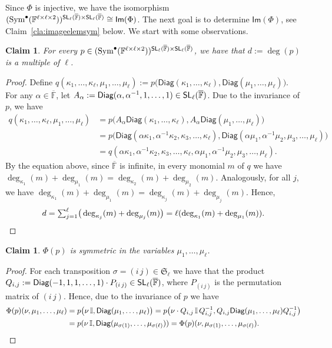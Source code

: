 \documentclass[a4paper]{extarticle}
\newcommand{\aS}{\mathfrak{S}}
\newcommand{\IF}{\mathbb{F}}
\newcommand{\oIF}{{\overline{\mathbb{F}}}}
\newcommand{\SL}{\textsf{\textup{SL}}}
\newcommand{\Sym}{\textup{Sym}}
\newcommand{\Diag}{\textsf{Diag}}
\renewcommand{\Im}{\mathsf{Im}}
\numberwithin{theorem}{section}
\newtheorem{claim}[theorem]{Claim}
\theoremstyle{definition}
\begin{document}
Since $\Phi$ is injective, we have the isomorphism $(\Sym^{\bullet}(\IF^{\ell\times\ell\times 2}))^{\SL_\ell(\oIF)\times \SL_\ell(\oIF)}\cong \Im(\Phi)$. The next goal is to determine $\Im(\Phi)$, see Claim~\ref{cla:imageelemsym} below. We start with some observations.
\begin{claim}\label{cla:multipleofell}
For every $p \in (\Sym^{\bullet}(\IF^{\ell\times\ell\times 2}))^{\SL_\ell(\oIF)\times \SL_\ell(\oIF)}$, we have that $d:=\deg(p)$ is a multiple of $\ell$.
\end{claim}
\begin{proof}
Define $q(\kappa_1,\dots,\kappa_\ell,\mu_1,\dots,\mu_\ell) := p\big(\Diag(\kappa_1,\dots,\kappa_\ell),\Diag(\mu_1,\dots,\mu_\ell)\big)$.
For any $\alpha\in\oIF$, let $A_\alpha := \Diag(\alpha,\alpha^{-1},1,\dots,1) \in \SL_\ell(\oIF)$.
Due to the invariance of $p$, we have
\begin{align*}
q(\kappa_1,\dots,\kappa_\ell,\mu_1,\dots,\mu_\ell) &= 
p\big(A_\alpha\Diag(\kappa_1,\dots,\kappa_\ell),A_\alpha\Diag(\mu_1,\dots,\mu_\ell)\big)
\\
&=
p\big(\Diag(\alpha\kappa_1,\alpha^{-1}\kappa_2,\kappa_3,\dots,\kappa_\ell),\Diag(\alpha\mu_1,\alpha^{-1}\mu_2,\mu_3,\dots,\mu_\ell)\big)
\\
&=
q(\alpha\kappa_1,\alpha^{-1}\kappa_2,\kappa_3,\dots,\kappa_\ell,\alpha \mu_1,\alpha^{-1}\mu_2,\mu_3,\dots,\mu_\ell).
\end{align*}
By the equation above, since $\oIF$ is infinite, in every monomial $m$ of $q$ we have $\deg_{\kappa_1}(m)+\deg_{\mu_1}(m)=\deg_{\kappa_2}(m)+\deg_{\mu_2}(m)$.
Analogously, for all $j$, we have $\deg_{\kappa_1}(m)+\deg_{\mu_1}(m)=\deg_{\kappa_j}(m)+\deg_{\mu_j}(m)$.
Hence,
\[
d = {\textstyle\sum_{j=1}^\ell}
\big(\deg_{\kappa_j}(m)
+
\deg_{\mu_j}(m)\big)
= \ell (
\deg_{\kappa_1}(m)
+
\deg_{\mu_1}(m)
).
\qedhere
\]
\end{proof}
\begin{claim}\label{cla:symmetricinmu}
$\Phi(p)$ is symmetric in the variables $\mu_1,\ldots,\mu_\ell$.
\end{claim}
\begin{proof}
For each transposition $\sigma = (i \, j) \in \aS_\ell$ we have that the product $Q_{i,j}:=\Diag(-1,1,1,\ldots,1)\cdot P_{(i \, j)} \in \SL_\ell(\oIF)$, where $P_{(i \, j)}$ is the permutation matrix of $(i \, j)$. Hence, due to the invariance of $p$ we have
\begin{align*}
\Phi(p)(\nu,\mu_1,\dots,\mu_\ell)
&=
p\big(\nu\, \mathbb{I},\mathsf{Diag}(\mu_1,\dots,\mu_\ell)\big)= p\big(\nu\cdot Q_{i,j}\, \mathbb{I}\, Q_{i,j}^{-1},Q_{i,j}\Diag(\mu_1,\dots,\mu_\ell)Q_{i,j}^{-1}\big)
\\
&=p(\nu\, \mathbb{I},\mathsf{Diag}(\mu_{\sigma(1)},\dots,\mu_{\sigma(\ell)}))= \Phi(p)(\nu,\mu_{\sigma(1)},\dots,\mu_{\sigma(\ell)}).\qedhere
\end{align*}
\end{proof}
\end{document}
